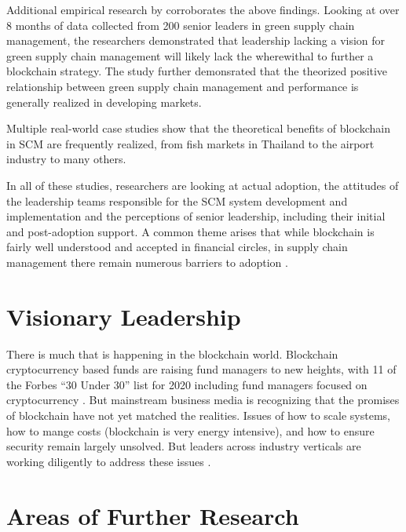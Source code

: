 \documentclass[man]{apa7}
\begin{document}
Additional empirical research by \textcite{liuBehavioralTechnicalPerspectives2020}
corroborates the above findings. Looking at over 8 months of data collected
from 200 senior leaders in green supply chain management, the researchers
demonstrated that leadership lacking a vision for green supply chain management
will likely lack the wherewithal to further a blockchain strategy. The study
further demonsrated that the theorized positive relationship between green
supply chain management and performance is generally realized in developing
markets.

Multiple real-world case studies show that the theoretical benefits of
blockchain in SCM are frequently realized, from fish markets in Thailand
\parencite{tsolakisSupplyNetworkDesign2020} to the airport industry
\parencite{divaioBlockchainTechnologySupply2020} to many others.

In all of these studies, researchers are looking at actual adoption, the
attitudes of the leadership teams responsible for the SCM system development and
implementation and the perceptions of senior leadership, including their initial
and post-adoption support. A common theme arises that while blockchain is fairly
well understood and accepted in financial circles, in supply chain management
there remain numerous barriers to adoption
\cite{kouhizadehBlockchainTechnologySustainable2021,upadhyayDemystifyingBlockchainCritical2020}.

\section{Visionary Leadership}
\label{sec:org2b75779}

There is much that is happening in the blockchain world. Blockchain
cryptocurrency based funds are raising fund managers to new heights, with 11 of
the Forbes ``30 Under 30'' list for 2020 including fund managers focused on
cryptocurrency \parencite{castillo11BitcoinBlockchain2020}. But mainstream business
media is recognizing that the promises of blockchain have not yet matched the
realities. Issues of how to scale systems, how to mange costs (blockchain is
very energy intensive), and how to ensure security remain largely unsolved. But
leaders across industry verticals are working diligently to address these
issues \parencite{friedrichCouncilPostWhy}. 

\section{Areas of Further Research}
\label{sec:org827f273}
\end{document}
